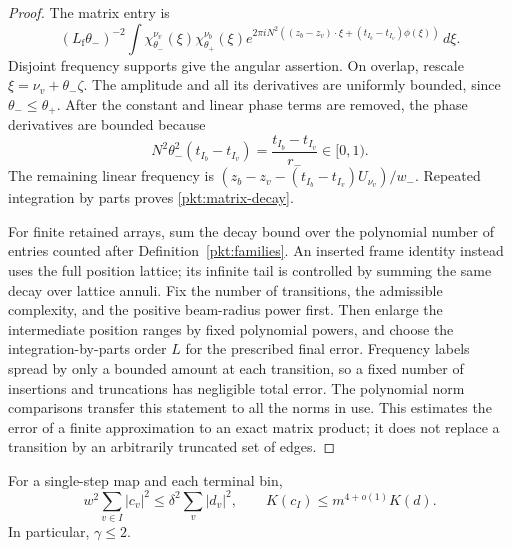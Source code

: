 \begin{proof}
The matrix entry is
\[
 (L_{\mathrm f}\theta_-)^{-2}
 \int\chi_{\theta_-}^{\nu_v}(\xi)
      \chi_{\theta_+}^{\nu_b}(\xi)
 e^{2\pi iN^2((z_b-z_v)\cdot\xi+
                    (t_{I_b}-t_{I_v})\phi(\xi))}\,d\xi.
\]
Disjoint frequency supports give the angular assertion.  On overlap,
rescale $\xi=\nu_v+\theta_-\zeta$.  The amplitude and all its
derivatives are uniformly bounded, since $\theta_-\le\theta_+$.
After the constant and linear phase terms are removed, the phase
derivatives are bounded because
\[
 N^2\theta_-^2(t_{I_b}-t_{I_v})
    =\frac{t_{I_b}-t_{I_v}}{r_-}\in[0,1).
\]
The remaining linear frequency is
$(z_b-z_v-(t_{I_b}-t_{I_v})U_{\nu_v})/w_-$.
Repeated integration by parts proves \eqref{pkt:matrix-decay}.

For finite retained arrays, sum the decay bound over the polynomial
number of entries counted after Definition~\ref{pkt:families}.  An
inserted frame identity instead uses the full position lattice; its
infinite tail is controlled by summing the same decay over lattice
annuli.  Fix the number of transitions, the admissible complexity, and
the positive beam-radius power first.  Then enlarge the intermediate
position ranges by fixed polynomial powers, and choose the
integration-by-parts order $L$ for the prescribed final error.
Frequency labels spread by only a bounded amount at each transition,
so a fixed number of insertions and truncations has negligible total
error.  The polynomial norm comparisons transfer this statement to
all the norms in use.  This estimates the error of a finite approximation
to an exact matrix product; it does not replace a transition by an
arbitrarily truncated set of edges.
\end{proof}

\begin{lemma}\label{pkt:crude}
For a single-step map and each terminal bin,
\begin{equation}\label{pkt:mass-capacity}
 w^2\sum_{v\in I}|c_v|^2\le\delta^2\sum_v|d_v|^2,
 \qquad K(c_I)\le m^{4+o(1)}K(d).
\end{equation}
In particular, $\gamma\le2$.
\end{lemma}

